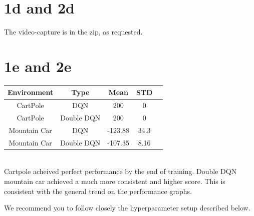 \documentclass[12pt]{article}
\begin{document}
\begin{solution}
\section{1d and 2d}
The video-capture is in the zip, as requested.

\section{1e and 2e}
\begin{tabular}{|c|c|c|c|l}
\hline
Environment & Type & Mean & STD   \\ \hline
  CartPole & DQN  & 200  & 0   \\ \hline
  CartPole & Double DQN  & 200  & 0   \\ \hline
  Mountain Car & DQN  & -123.88  & 34.3   \\ \hline
    Mountain Car & Double DQN  & -107.35  & 8.16  \\ \hline
\end{tabular}\\

Cartpole acheived perfect performance by the end of training.  Double DQN mountain car achieved a much more consistent and higher score.  This is consistent with the general trend on the performance graphs.
\end{solution}

We recommend you to follow closely the hyperparameter setup described below.
\end{document}
